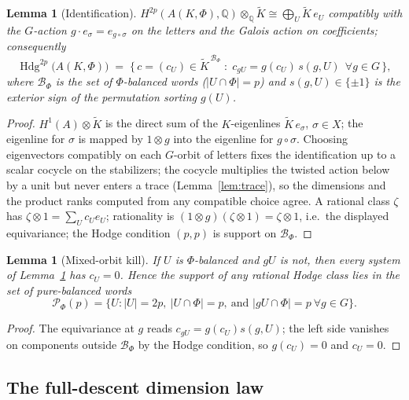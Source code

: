 \documentclass[11pt]{article}
\newtheorem{lemma}[theorem]{Lemma}
\begin{document}
\begin{lemma}[Identification]\label{lem:ident}
$H^{2p}(A(K,\Phi),\mathbb Q)\otimes_{\mathbb Q}\widetilde K
\cong \bigoplus_U \widetilde K\, e_U$ compatibly with the $G$-action
$g\cdot e_\sigma = e_{g\circ\sigma}$ on the letters and the Galois action on
coefficients; consequently
\[
\operatorname{Hdg}^{2p}\!\big(A(K,\Phi)\big)
\;=\;
\Big\{\,c=(c_U)\in \widetilde K^{\,\mathcal B_\Phi}\;:\;
c_{gU}=g(c_U)\,s(g,U)\ \ \forall g\in G\,\Big\},
\]
where $\mathcal B_\Phi$ is the set of \emph{$\Phi$-balanced} words
($|U\cap\Phi|=p$) and $s(g,U)\in\{\pm1\}$ is the exterior sign of the
permutation sorting $g(U)$.
\end{lemma}

\begin{proof}
$H^1(A)\otimes\widetilde K$ is the direct sum of the $K$-eigenlines
$\widetilde K\,e_\sigma$, $\sigma\in X$; the eigenline for $\sigma$ is mapped
by $1\otimes g$ into the eigenline for $g\circ\sigma$. Choosing eigenvectors
compatibly on each $G$-orbit of letters fixes the identification up to a
scalar cocycle on the stabilizers; the cocycle multiplies the twisted action
below by a unit but never enters a trace (Lemma~\ref{lem:trace}), so the
dimensions and the product ranks computed from any compatible choice agree.
A rational class $\zeta$ has $\zeta\otimes 1=\sum_U c_U e_U$; rationality is
$(1\otimes g)(\zeta\otimes 1)=\zeta\otimes 1$, i.e.\ the displayed equivariance;
the Hodge condition $(p,p)$ is support on $\mathcal B_\Phi$.
\end{proof}

\begin{lemma}[Mixed-orbit kill]\label{lem:kill}
If $U$ is $\Phi$-balanced and $gU$ is not, then every system of
Lemma~\ref{lem:ident} has $c_U=0$. Hence the support of any rational Hodge
class lies in the set of \emph{pure-balanced} words
\[
\mathcal P_\Phi(p)=\{U : |U|=2p,\ |U\cap\Phi|=p,\ \text{and } |gU\cap\Phi|=p
\ \forall g\in G\}.
\]
\end{lemma}

\begin{proof}
The equivariance at $g$ reads $c_{gU}=g(c_U)s(g,U)$; the left side vanishes
on components outside $\mathcal B_\Phi$ by the Hodge condition, so
$g(c_U)=0$ and $c_U=0$.
\end{proof}

\subsection{The full-descent dimension law}
\end{document}

